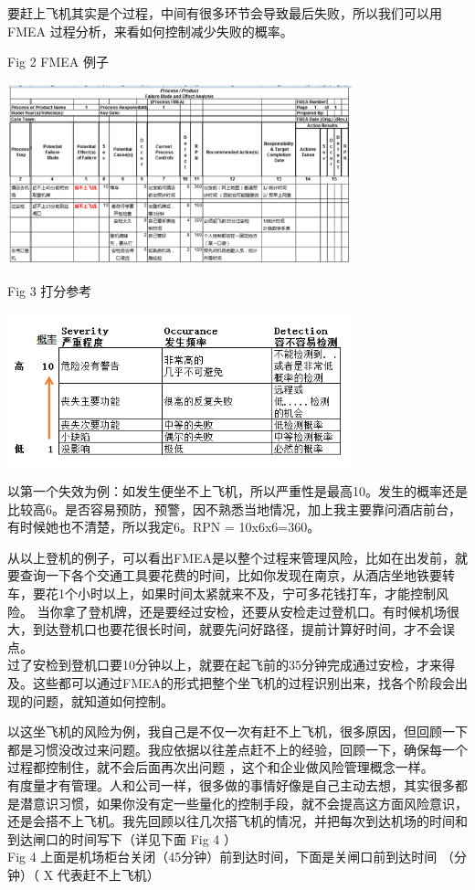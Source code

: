 要赶上飞机其实是个过程，中间有很多环节会导致最后失败，所以我们可以用
FMEA 过程分析，来看如何控制减少失败的概率。

Fig 2 FMEA 例子


\includegraphics[width=10cm]{风险与机会2_FMEA.png}

Fig 3 打分参考


\includegraphics[width=10cm]{风险与机会3_打分参考_1.png}

以第一个失效为例：如发生便坐不上飞机，所以严重性是最高10。发生的概率还是比较高6。是否容易预防，预警，因不熟悉当地情况，加上我主要靠问酒店前台，有时候她也不清楚，所以我定6。RPN
= 10x6x6=360。

从以上登机的例子，可以看出FMEA是以整个过程来管理风险，比如在出发前，就要查询一下各个交通工具要花费的时间，比如你发现在南京，从酒店坐地铁要转车，要花1个小时以上，如果时间太紧就来不及，宁可多花钱打车，才能控制风险。
当你拿了登机牌，还是要经过安检，还要从安检走过登机口。有时候机场很大，到达登机口也要花很长时间，就要先问好路径，提前计算好时间，才不会误点。\\
过了安检到登机口要10分钟以上，就要在起飞前的35分钟完成通过安检，才来得及。这些都可以通过FMEA的形式把整个坐飞机的过程识别出来，找各个阶段会出现的问题，就知道如何控制。

以这坐飞机的风险为例，我自己是不仅一次有赶不上飞机，很多原因，但回顾一下都是习惯没改过来问题。我应依据以往差点赶不上的经验，回顾一下，确保每一个过程都控制住，就不会后面再次出问题
，这个和企业做风险管理概念一样。\\
有度量才有管理。人和公司一样，很多做的事情好像是自己主动去想，其实很多都是潜意识习惯，如果你没有定一些量化的控制手段，就不会提高这方面风险意识，还是会搭不上飞机。我先回顾以往几次搭飞机的情况，并把每次到达机场的时间和到达闸口的时间写下（详见下面
Fig 4 ）\\
Fig 4 上面是机场柜台关闭（45分钟）前到达时间，下面是关闸口前到达时间
（分钟）（ X 代表赶不上飞机）

